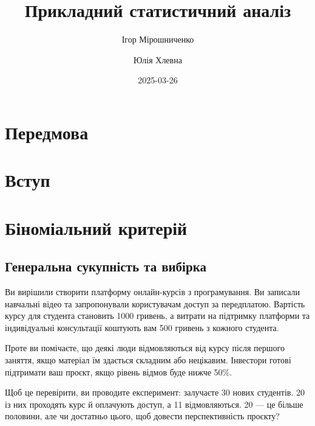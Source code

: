 \documentclass[
  letterpaper,
  10pt,
  openany]{report}
\title{Прикладний статистичний аналіз}
\author{Ігор Мірошниченко \and Юлія Хлевна}
\date{2025-03-26}
\renewcommand*\contentsname{Зміст}
\newcommand\contentsname{Зміст}
\theoremstyle{definition}
\theoremstyle{remark}
\begin{document}
\maketitle

\renewcommand*\contentsname{Зміст}
{
\hypersetup{linkcolor=}
\setcounter{tocdepth}{1}
\tableofcontents
}


\chapter*{Передмова}\label{ux43fux435ux440ux435ux434ux43cux43eux432ux430}



\chapter*{Вступ}\label{sec-intro}



\chapter{Біноміальний критерій}\label{sec-binom}

\section{Генеральна сукупність та
вибірка}\label{ux433ux435ux43dux435ux440ux430ux43bux44cux43dux430-ux441ux443ux43aux443ux43fux43dux456ux441ux442ux44c-ux442ux430-ux432ux438ux431ux456ux440ux43aux430}

Ви вирішили створити платформу онлайн-курсів з програмування. Ви
записали навчальні відео та запропонували користувачам доступ за
передплатою. Вартість курсу для студента становить 1000 гривень, а
витрати на підтримку платформи та індивідуальні консультації коштують
вам 500 гривень з кожного студента.

Проте ви помічаєте, що деякі люди відмовляються від курсу після першого
заняття, якщо матеріал їм здається складним або нецікавим. Інвестори
готові підтримати ваш проєкт, якщо рівень відмов буде нижче 50\%.

Щоб це перевірити, ви проводите експеримент: залучаєте 30 нових
студентів. 20 із них проходять курс й оплачують доступ, а 11
відмовляються. 20 --- це більше половини, але чи достатньо цього, щоб
довести перспективність проєкту?
\end{document}
